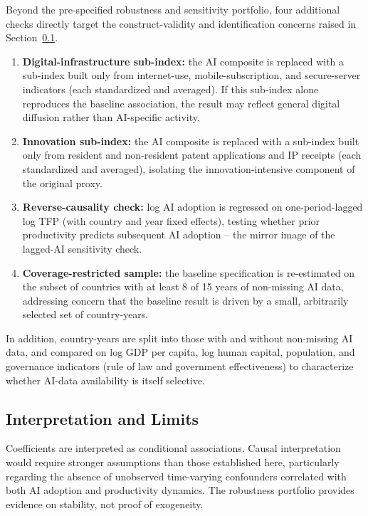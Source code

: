 Beyond the pre-specified robustness and sensitivity portfolio, four additional checks directly target the construct-validity and identification concerns raised in Section~\ref{sec:interpretation-and-limits}.

\begin{enumerate}
\item \textbf{Digital-infrastructure sub-index:} the AI composite is replaced with a sub-index built only from internet-use, mobile-subscription, and secure-server indicators (each standardized and averaged). If this sub-index alone reproduces the baseline association, the result may reflect general digital diffusion rather than AI-specific activity.
\item \textbf{Innovation sub-index:} the AI composite is replaced with a sub-index built only from resident and non-resident patent applications and IP receipts (each standardized and averaged), isolating the innovation-intensive component of the original proxy.
\item \textbf{Reverse-causality check:} log AI adoption is regressed on one-period-lagged log TFP (with country and year fixed effects), testing whether prior productivity predicts subsequent AI adoption -- the mirror image of the lagged-AI sensitivity check.
\item \textbf{Coverage-restricted sample:} the baseline specification is re-estimated on the subset of countries with at least 8 of 15 years of non-missing AI data, addressing concern that the baseline result is driven by a small, arbitrarily selected set of country-years.
\end{enumerate}

In addition, country-years are split into those with and without non-missing AI data, and compared on log GDP per capita, log human capital, population, and governance indicators (rule of law and government effectiveness) to characterize whether AI-data availability is itself selective.

\subsection{Interpretation and Limits}
\label{sec:interpretation-and-limits}

Coefficients are interpreted as conditional associations. Causal interpretation would require stronger assumptions than those established here, particularly regarding the absence of unobserved time-varying confounders correlated with both AI adoption and productivity dynamics. The robustness portfolio provides evidence on stability, not proof of exogeneity.

